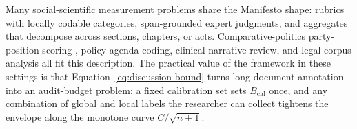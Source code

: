 Many social-scientific measurement problems share the Manifesto
shape: rubrics with locally codable categories, span-grounded
expert judgments, and aggregates that decompose across sections,
chapters, or acts. Comparative-politics party-position scoring
\citep{BenoitEtAl2025,ManifestoProject2025a}, policy-agenda coding,
clinical narrative review, and legal-corpus analysis all fit this
description. The practical value of the framework in these settings
is that Equation~\eqref{eq:discussion-bound} turns long-document
annotation into an audit-budget problem: a fixed calibration set
sets $B_{\mathrm{cal}}$ once, and any combination of global and
local labels the researcher can collect tightens the envelope along
the monotone curve $C/\sqrt{n+1}$.
